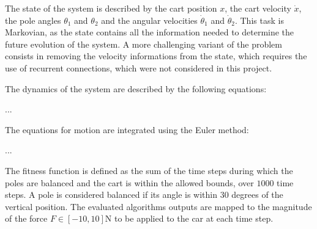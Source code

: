 The state of the system is described by the cart position $x$, the cart velocity $\dot{x}$, the pole angles $\theta_1$ and $\theta_2$ and the angular velocities $\dot{\theta}_1$ and $\dot{\theta}_2$.
This task is Markovian, as the state contains all the information needed to determine the future evolution of the system.
A more challenging variant of the problem consists in removing the velocity informations from the state, which requires the use of recurrent connections, which were not considered
in this project.

The dynamics of the system are described by the following equations:

... %

The equations for motion are integrated using the Euler method:

... %

The fitness function is defined as the sum of the time steps during which the poles are balanced and the cart is within the allowed bounds, over $1000$ time steps.
A pole is considered balanced if its angle is within $30$ degrees of the vertical position.
The evaluated algorithms outputs are mapped to the magnitude of the force $F \in [-10, 10]$N to be applied to the car at each time step.
